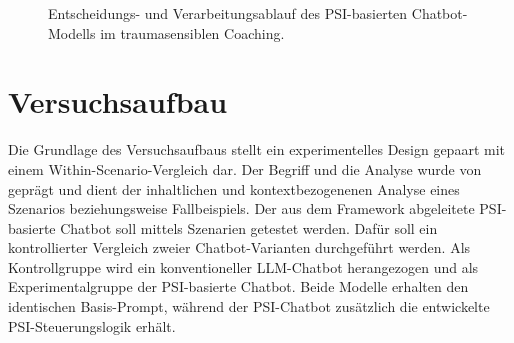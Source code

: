 \begin{figure}[htbp]
{%
}
\caption{Entscheidungs- und Verarbeitungsablauf des PSI-basierten
Chatbot-Modells im traumasensiblen Coaching.}
\label{fig:psi-chatbot-ablauf}
\end{figure}


\section{Versuchsaufbau}
Die Grundlage des Versuchsaufbaus stellt ein experimentelles Design \citep{rubin2008comment} gepaart mit einem Within-Scenario-Vergleich dar. Der Begriff und die Analyse wurde von \cite{eisenhardt2009building} geprägt und dient der inhaltlichen und kontextbezogenenen Analyse eines Szenarios beziehungsweise Fallbeispiels. Der aus dem Framework abgeleitete PSI-basierte Chatbot soll mittels Szenarien getestet werden. Dafür soll ein kontrollierter Vergleich zweier Chatbot-Varianten durchgeführt werden. Als Kontrollgruppe wird ein konventioneller LLM-Chatbot herangezogen und als Experimentalgruppe der PSI-basierte Chatbot. Beide Modelle erhalten den identischen Basis-Prompt, während der PSI-Chatbot zusätzlich die entwickelte PSI-Steuerungslogik erhält.

